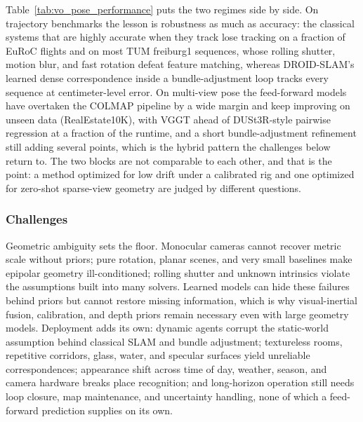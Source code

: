Table~\ref{tab:vo_pose_performance} puts the two regimes side by side. On trajectory benchmarks the lesson is robustness as much as accuracy: the classical systems that are highly accurate when they track lose tracking on a fraction of EuRoC flights and on most TUM freiburg1 sequences, whose rolling shutter, motion blur, and fast rotation defeat feature matching, whereas DROID-SLAM's learned dense correspondence inside a bundle-adjustment loop tracks every sequence at centimeter-level error. On multi-view pose the feed-forward models have overtaken the COLMAP pipeline by a wide margin and keep improving on unseen data (RealEstate10K), with VGGT ahead of DUSt3R-style pairwise regression at a fraction of the runtime, and a short bundle-adjustment refinement still adding several points, which is the hybrid pattern the challenges below return to. The two blocks are not comparable to each other, and that is the point: a method optimized for low drift under a calibrated rig and one optimized for zero-shot sparse-view geometry are judged by different questions.

\subsubsection{Challenges}

Geometric ambiguity sets the floor.
Monocular cameras cannot recover metric scale without priors; pure rotation, planar scenes, and very small baselines make epipolar geometry ill-conditioned; rolling shutter and unknown intrinsics violate the assumptions built into many solvers.
Learned models can hide these failures behind priors but cannot restore missing information, which is why visual-inertial fusion, calibration, and depth priors remain necessary even with large geometry models.
Deployment adds its own: dynamic agents corrupt the static-world assumption behind classical SLAM and bundle adjustment; textureless rooms, repetitive corridors, glass, water, and specular surfaces yield unreliable correspondences; appearance shift across time of day, weather, season, and camera hardware breaks place recognition; and long-horizon operation still needs loop closure, map maintenance, and uncertainty handling, none of which a feed-forward prediction supplies on its own.

